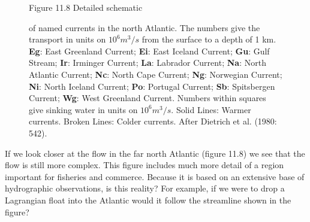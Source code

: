 \begin{figure}[t!]
\footnotesize
Figure 11.8 Detailed schematic \rule{0mm}{3ex}of named currents in the
north Atlantic.  The numbers give the transport in units on $10^6 m^3/s$ from the surface to a depth
of 1 km. \textbf{Eg}: East Greenland Current; \textbf{Ei}: East
Iceland Current; \textbf{Gu}: Gulf Stream;
\textbf{Ir}: Irminger Current; \textbf{La}: Labrador Current;
\textbf{Na}: North Atlantic Current; \textbf{Nc}: North Cape Current;
\textbf{Ng}: Norwegian Current; \textbf{Ni}: North Iceland Current;
\textbf{Po}: Portugal Current; \textbf{Sb}: Spitsbergen Current;
\textbf{Wg}: West Greenland Current. Numbers within squares give
sinking water in units on $10^6 m^3 /s$. Solid Lines: Warmer
currents. Broken Lines: Colder currents. After Dietrich et al. (1980:
542).
\label{fig:NATLcur1}
\vspace{-3ex}
\end{figure}

If we look closer at the flow in the far north Atlantic (figure 11.8)
we see that the flow is still more complex. This figure includes much
more detail of a region important for fisheries and commerce. Because
it is based on an extensive base of hydrographic observations, is this
reality? For example, if we were to drop a Lagrangian float into the
Atlantic would it follow the streamline shown in the figure?

